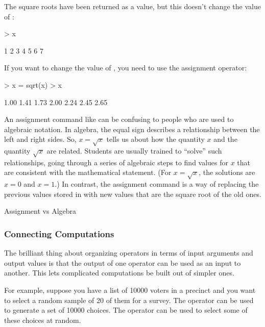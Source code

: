 The square roots have been returned as a value, but this doesn't
change the value of :
\begin{Schunk}
\begin{Sinput}
> x
\end{Sinput}
\begin{Soutput}
[1] 1 2 3 4 5 6 7
\end{Soutput}
\end{Schunk}
If you want to change the value of , you need to use the
assignment operator:
\begin{Schunk}
\begin{Sinput}
> x = sqrt(x)
> x
\end{Sinput}
\begin{Soutput}
[1] 1.00 1.41 1.73 2.00 2.24 2.45 2.65
\end{Soutput}
\end{Schunk}

\begin{aside}
An assignment command like  can be confusing to
people who are used to algebraic notation.  In algebra, the equal sign
describes a relationship between the left and right sides.  
So, $x = \sqrt{x}$ tells us about how the quantity $x$ and the
quantity $\sqrt{x}$ are related.  Students are usually trained to
``solve'' such relationships, going through a series of algebraic 
steps to find values for $x$ that are
consistent with the mathematical statement.  (For $x = \sqrt{x}$, the solutions
are $x=0$ and $x=1$.)  In contrast, the assignment command 
 is a way of replacing the previous values stored
in  with new values that are the square root of the old
ones.  
\caption{\label{aside:notation}Assignment vs Algebra}
\end{aside}


\subsubsection{Connecting Computations}


The brilliant thing about organizing operators in terms of input
arguments and output values is that the output of one operator can be
used as an input to another.  This lets complicated computations be
built out of simpler ones.

For example, suppose you have a list of 10000
voters in a precinct and you want to select a random sample of 20 of
them for a survey. The  operator can be used to generate
a set of 10000 choices.  The  operator can be used to
select some of these choices at random.


